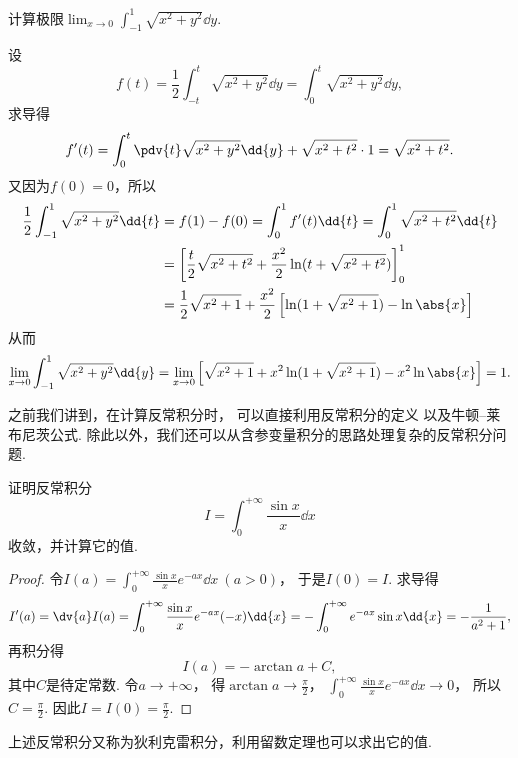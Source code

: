 \begin{example}%
\def\l{\lim_{x\to0}}%
计算极限\(\l \int_{-1}^1 \sqrt{x^2+y^2} \dd{y}\).
\begin{solution}
设\begin{equation*}
f(t)
=\frac{1}{2} \int_{-t}^t \sqrt{x^2+y^2} \dd{y}
=\int_0^t \sqrt{x^2+y^2} \dd{y},
\end{equation*}
求导得\begin{equation*}
f'(t)
= \int_0^t \pdv{t} \sqrt{x^2+y^2} \dd{y}
	+ \sqrt{x^2+t^2} \cdot 1
= \sqrt{x^2+t^2}.
\end{equation*}又因为\(f(0) = 0\)，所以\begin{align*}
\frac{1}{2} \int_{-1}^1 \sqrt{x^2+y^2} \dd{t}
&=f(1) - f(0)
= \int_0^1 f'(t) \dd{t}
= \int_0^1 \sqrt{x^2+t^2} \dd{t} \\
&= \left[
\frac{t}{2} \sqrt{x^2+t^2} + \frac{x^2}{2} \ln(t+\sqrt{x^2+t^2})
\right]_0^1 \\
&= \frac{1}{2} \sqrt{x^2+1} + \frac{x^2}{2} \left[ \ln(1+\sqrt{x^2+1}) - \ln\abs{x} \right]
\end{align*}
从而\begin{equation*}
\l \int_{-1}^1 \sqrt{x^2+y^2} \dd{y}
= \l \left[
\sqrt{x^2+1}
+ x^2 \ln(1+\sqrt{x^2+1}) - x^2 \ln\abs{x}
\right]
= 1.
\end{equation*}
\end{solution}
\end{example}

之前我们讲到，在计算反常积分时，
可以直接利用反常积分的定义
以及牛顿--莱布尼茨公式.
除此以外，我们还可以从含参变量积分的思路处理复杂的反常积分问题.

\begin{example}
证明反常积分\begin{equation*}
	I = \int_0^{+\infty} \frac{\sin x}{x} \dd{x}
\end{equation*}收敛，并计算它的值.
\begin{proof}
令\(I(a) = \int_0^{+\infty} \frac{\sin x}{x} e^{-ax} \dd{x}\ (a>0)\)，
于是\(I(0) = I\).
求导得\begin{equation*}
	I'(a) = \dv{a} I(a)
	= \int_0^{+\infty} \frac{\sin x}{x} e^{-ax} (-x) \dd{x}
	= - \int_0^{+\infty} e^{-ax} \sin x \dd{x}
	= - \frac{1}{a^2+1},
\end{equation*}
再积分得\begin{equation*}
	I(a) = -\arctan a + C,
\end{equation*}
其中\(C\)是待定常数.
令\(a\to+\infty\)，
得\(\arctan a\to\frac{\pi}{2}\)，
\(\int_0^{+\infty} \frac{\sin x}{x} e^{-ax} \dd{x} \to 0\)，
所以\(C = \frac{\pi}{2}\).
因此\(I = I(0) = \frac{\pi}{2}\).
\end{proof}
\end{example}
上述反常积分又称为狄利克雷积分，利用留数定理也可以求出它的值.
